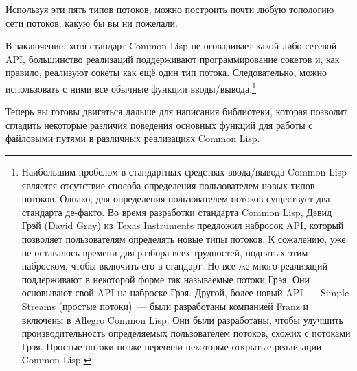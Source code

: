 Используя эти пять типов потоков, можно построить почти любую топологию сети потоков,
какую бы вы ни пожелали.

В заключение, хотя стандарт Common Lisp не оговаривает какой-либо сетевой API, большинство
реализаций поддерживают программирование сокетов и, как правило, реализуют сокеты как ещё
один тип потока. Следовательно, можно использовать с ними все обычные функции
вводы/вывода.\footnote{Наибольшим пробелом в стандартных средствах ввода/вывода Common
  Lisp является отсутствие способа определения пользователем новых типов потоков. Однако,
  для определения пользователем потоков существует два стандарта де-факто. Во время
  разработки стандарта Common Lisp, Дэвид Грэй (David Gray) из Texas Instruments предложил
  набросок API, который позволяет пользователям определять новые типы потоков. К
  сожалению, уже не оставалось времени для разбора всех трудностей, поднятых этим
  наброском, чтобы включить его в стандарт. Но все же много реализаций поддерживают в
  некоторой форме так называемые потоки Грэя. Они основывают свой API на наброске
  Грэя. Другой, более новый API~--- Simple Streams (простые потоки)~--- были разработаны
  компанией Franz и включены в Allegro Common Lisp. Они были разработаны, чтобы улучшить
  производительность определяемых пользователем потоков, схожих с потоками Грэя. Простые
  потоки позже переняли некоторые открытые реализации Common Lisp.}

Теперь вы готовы двигаться дальше для написания библиотеки, которая позволит сгладить
некоторые различия поведения основных функций для работы с файловыми путями в различных
реализациях Common Lisp.

